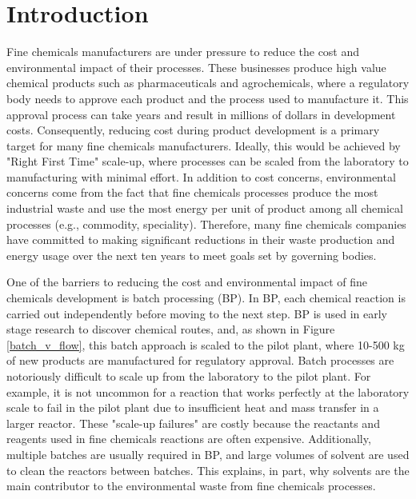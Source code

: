 \chapter{Introduction}\label{ch:introduction}

Fine chemicals manufacturers are under pressure to reduce the cost and environmental impact of their processes. These businesses produce high value chemical products such as pharmaceuticals and agrochemicals, where a regulatory body needs to approve each product and the process used to manufacture it. This approval process can take years and result in millions of dollars in development costs.\cite{Prasad2017} Consequently, reducing cost during product development is a primary target for many fine chemicals manufacturers. Ideally, this would be achieved by "Right First Time" scale-up, where processes can be scaled from the laboratory to manufacturing with minimal effort.\cite{Poechlauer2013} In addition to cost concerns, environmental concerns come from the fact that fine chemicals processes produce the most industrial waste and use the most energy per unit of product among all chemical processes (e.g., commodity, speciality).\cite{Sheldon2018} Therefore, many fine chemicals companies have committed to making significant reductions in their waste production and energy usage over the next ten years to meet goals set by governing bodies.\cite{BASF2020}

One of the barriers to reducing the cost and environmental impact of fine chemicals development is batch processing (BP).  In BP, each chemical reaction is carried out independently before moving to the next step. BP is used in early stage research to discover chemical routes, and, as shown in Figure \ref{batch_v_flow}, this batch approach is scaled to the pilot plant, where 10-500 kg of new products are manufactured for regulatory approval. Batch processes are notoriously difficult to scale up from the laboratory to the pilot plant. For example, it is not uncommon for a reaction that works perfectly at the laboratory scale to fail in the pilot plant due to insufficient heat and mass transfer in a larger reactor. These "scale-up failures" are costly because the reactants and reagents used in fine chemicals reactions are often expensive. Additionally, multiple batches are usually required in BP, and large volumes of solvent are used to clean the reactors between batches.\cite{Lee2016, Sheldon2018} This explains, in part, why solvents are the main contributor to the environmental waste from fine chemicals processes.\cite{Rogers2019}

